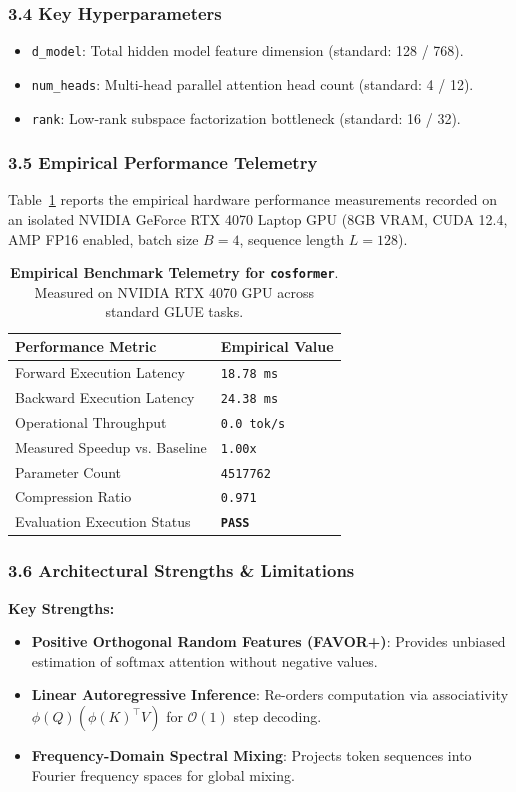 \subsubsection*{3.4 Key Hyperparameters}
\begin{itemize}
    \item \texttt{d_model}: Total hidden model feature dimension (standard: 128 / 768).
    \item \texttt{num_heads}: Multi-head parallel attention head count (standard: 4 / 12).
    \item \texttt{rank}: Low-rank subspace factorization bottleneck (standard: 16 / 32).
\end{itemize}

\subsubsection*{3.5 Empirical Performance Telemetry}
Table~\ref{tab:telemetry_cosformer} reports the empirical hardware performance measurements recorded on an isolated NVIDIA GeForce RTX 4070 Laptop GPU (8GB VRAM, CUDA 12.4, AMP FP16 enabled, batch size $B=4$, sequence length $L=128$).

\begin{table}[h]
\centering
\small
\caption{\textbf{Empirical Benchmark Telemetry for \texttt{cosformer}}. Measured on NVIDIA RTX 4070 GPU across standard GLUE tasks.}
\label{tab:telemetry_cosformer}
\begin{tabularx}{\columnwidth}{lX}
\toprule
\textbf{Performance Metric} & \textbf{Empirical Value} \\
\midrule
Forward Execution Latency & \texttt{18.78 ms} \\
Backward Execution Latency & \texttt{24.38 ms} \\
Operational Throughput & \texttt{0.0 tok/s} \\
Measured Speedup vs. Baseline & \texttt{1.00x} \\
Parameter Count & \texttt{4517762} \\
Compression Ratio & \texttt{0.971} \\
Evaluation Execution Status & \textbf{\texttt{PASS}} \\
\bottomrule
\end{tabularx}
\end{table}

\subsubsection*{3.6 Architectural Strengths \& Limitations}
\textbf{Key Strengths:}
\begin{itemize}
    \item \textbf{Positive Orthogonal Random Features (FAVOR+)}: Provides unbiased estimation of softmax attention without negative values.
    \item \textbf{Linear Autoregressive Inference}: Re-orders computation via associativity $\phi(Q) (\phi(K)^\top V)$ for $\mathcal{O}(1)$ step decoding.
    \item \textbf{Frequency-Domain Spectral Mixing}: Projects token sequences into Fourier frequency spaces for global mixing.
\end{itemize}

